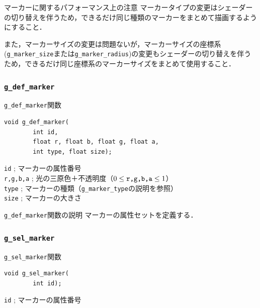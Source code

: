 \documentclass[platex,a4paper,12pt]{jsarticle}%
\begin{document}
\begin{itembox}[l]{マーカーに関するパフォーマンス上の注意}
マーカータイプの変更はシェーダーの切り替えを伴うため，できるだけ同じ種類のマーカーをまとめて描画するようにすること．

また，マーカーサイズの変更は問題ないが，マーカーサイズの座標系(\verb|g_marker_size|または\verb|g_marker_radius|)の変更もシェーダーの切り替えを伴うため，できるだけ同じ座標系のマーカーサイズをまとめて使用すること．
\end{itembox}

\clearpage
\subsubsection{\texttt{g\_def\_marker}}

\begin{itembox}[l]{\texttt{g\_def\_marker}関数}
\begin{verbatim}
void g_def_marker(
        int id,
        float r, float b, float g, float a,
        int type, float size);
\end{verbatim}
\verb|id| ; マーカーの属性番号\\
\verb|r,g,b,a| ; 光の三原色＋不透明度（$0\leq \verb|r,g,b,a| \leq 1$）\\
\verb|type| ; マーカーの種類（\verb|g_marker_type|の説明を参照）\\
\verb|size| ; マーカーの大きさ
\end{itembox}

\begin{itembox}[l]{\texttt{g\_def\_marker}関数の説明}
マーカーの属性セットを定義する．
\end{itembox}

\subsubsection{\texttt{g\_sel\_marker}}

\begin{itembox}[l]{\texttt{g\_sel\_marker}関数}
\begin{verbatim}
void g_sel_marker(
        int id);
\end{verbatim}
\verb|id| ; マーカーの属性番号
\end{itembox}
\end{document}
